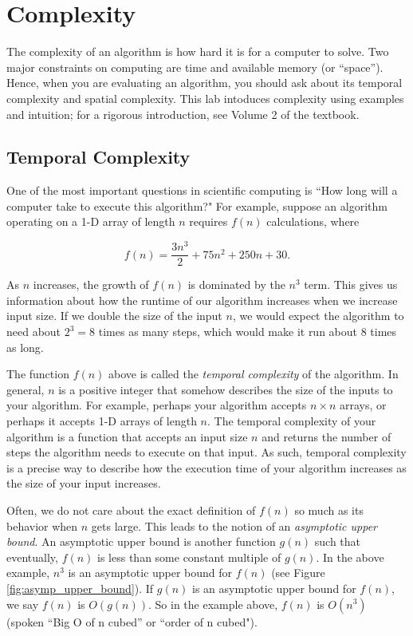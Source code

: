 

\section*{Complexity}
The complexity of an algorithm is how hard it is for a computer to solve. 
Two major constraints on computing are time and available memory (or ``space''). 
Hence, when you are evaluating an algorithm, you should ask about its temporal complexity and spatial complexity. 
This lab intoduces complexity using examples and intuition; for a rigorous introduction, see Volume 2 of the textbook.

\subsection*{Temporal Complexity}
One of the most important questions in scientific computing is ``How long will a computer take to execute this algorithm?"
For example, suppose an algorithm operating on a 1-D array of length $n$ requires $f(n)$ calculations, where

\begin{equation*}
f(n) = \frac{3n^3}{2} + 75n^2 + 250n + 30.
\end{equation*}

As $n$ increases, the growth of $f(n)$ is dominated by the $n^3$ term.
This gives us information about how the runtime of our algorithm increases when we increase input size. 
If we double the size of the input $n$, we would expect the algorithm to need about $2^3=8$ times as many steps, which would make it run about 8 times as long.

The function $f(n)$ above is called the \emph{temporal complexity} of the algorithm. 
In general, $n$ is a positive integer that somehow describes the size of the inputs to your algorithm. 
For example, perhaps your algorithm accepts $n \times n$ arrays, or perhaps it accepts 1-D arrays of length $n$. 
The temporal complexity of your algorithm is a function that accepts an input size $n$ and returns the number of steps the algorithm needs to execute on that input. 
As such, temporal complexity is a precise way to describe how the execution time of your algorithm increases as the size of your input increases.

Often, we do not care about the exact definition of $f(n)$ so much as its behavior when $n$ gets large. 
This leads to the notion of an \emph{asymptotic upper bound}. 
An asymptotic upper bound is another function $g(n)$ such that eventually, $f(n)$ is less than some constant multiple of $g(n)$. 
In the above example, $n^3$ is an asymptotic upper bound for $f(n)$ (see Figure \ref{fig:asymp_upper_bound}). 
If $g(n)$ is an asymptotic upper bound for $f(n)$, we say $f(n)$ is $O(g(n))$. 
So in the example above, $f(n)$ is $O(n^3)$ (spoken ``Big O of n cubed'' or ``order of n cubed").

